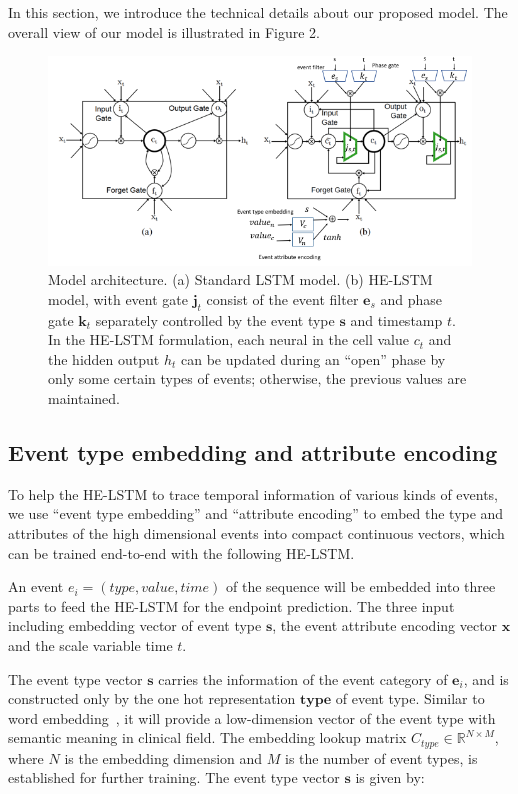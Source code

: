 \documentclass[letterpaper]{article} %
\begin{document}
In this section, we introduce the technical details about our proposed model. The overall view of our model is illustrated in Figure 2.



\begin{figure}[!t]
\centering

\includegraphics[width=.7\textwidth]{model.png}

\caption{Model architecture. (a) Standard LSTM model. (b) HE-LSTM model, with event gate $\bm j_t$ consist of the event filter $\bm e_s$ and phase gate $\bm k_t$  
separately controlled by  the event type $\bm s$ and timestamp $t$. In the HE-LSTM formulation, each neural in the cell value $c_t$ and the hidden output
$h_t$ can be updated during an ``open'' phase by only some certain  types of events; otherwise, the previous values are maintained.}
\label{fig:overview}

\end{figure}



\subsection{Event type embedding and attribute encoding}
To help the HE-LSTM to trace temporal information of various kinds of events, we use ``event type embedding'' and ``attribute encoding'' to embed the type and attributes of the high dimensional events into compact continuous vectors, which can be trained end-to-end with the following HE-LSTM. 

An event $e_i = (type,value,time)$ of the sequence will be embedded into three parts to feed the HE-LSTM for the endpoint prediction. The three input including  embedding vector of event type $\bm s$, the event attribute encoding vector $\bm x$ and the scale variable time $t$.

The event type vector $\bm s$ carries the information of the event category of $\bm e_i$, and is constructed only by the one hot representation $\bm{type}$ of event type. Similar to word embedding~\cite{mikolov2013distributed}, it will provide a low-dimension vector of the event type with semantic meaning in clinical field. The embedding lookup matrix $C_{type} \in \mathbb{R}^{N \times M}$,  where $N$ is the embedding dimension and $M$ is the number of event types, is established for further training. The event type vector $\bm s$ is given by:
\end{document}
